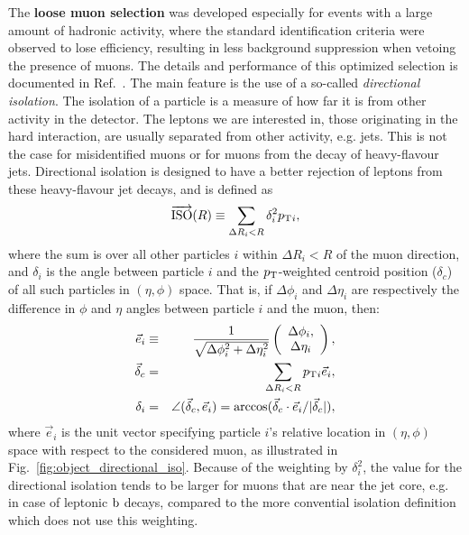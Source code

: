 The \textbf{loose muon selection} was developed especially for events with a
large amount of hadronic activity, where the standard identification criteria were observed to lose
efficiency, resulting in less background suppression when vetoing the presence of muons. 
The details and performance of this optimized selection is documented in
Ref.~\cite{CMS-AN2011-498}. 
The main feature is the use of a so-called \textit{directional isolation}.
The isolation of a particle is a measure of how far it is from other activity in the detector. The
leptons we are interested in, those originating in the hard interaction, are usually separated from
other activity, e.g. jets. This is not the case for misidentified muons or for muons from the decay
of heavy-flavour jets. Directional isolation is designed to have a better rejection of leptons from
these heavy-flavour jet decays, and is defined as
\begin{equation}
\overrightarrow{\mathrm{ISO}}(R) \equiv \sum_{\Delta R_{i} < R} \delta_{i}^{2}p_{\mathrm{T}}{}_{i} ,
\end{equation}
where the sum is over all other particles $i$ within $\Delta R_{i}<R$ of the muon direction,
and $\delta_{i}$ is the angle between particle $i$ and the $p_{\mathrm{T}}$-weighted centroid position
($\delta_{c}$) of all such particles in $(\eta,\phi)$ space. That is, if $\Delta\phi_i$ and
$\Delta\eta_i$ are respectively the difference in $\phi$ and $\eta$ angles between particle $i$ and
the muon, then:
\begin{eqnarray*}
\vec{e}_{i} & \equiv & \frac{1}{\sqrt{\Delta\phi_{i}^{2}+\Delta\eta_{i}^{2}}}\left(\begin{array}{c}
\Delta\phi_{i},\\
\Delta\eta_{i}
\end{array}\right),\\
\vec{\delta}_{c} & = & \sum_{\Delta R_{i}<R}p_{\mathrm{T}}{}_{i}\vec{e}_{i},\\
\delta_{i} & = &
\angle(\vec{\delta}_{c},\vec{e}_{i})=\arccos(\vec{\delta}_{c}\cdot\vec{e}_{i}/|\vec{\delta}_{c}|),
\end{eqnarray*}
where $\vec{e}_{i}$ is the unit vector specifying particle $i$'s relative location in $(\eta,\phi)$
space with respect to the considered muon, as illustrated in Fig.~\ref{fig:object_directional_iso}.
Because of the weighting by $\delta_{i}^{2}$, the value for the directional isolation tends to be
larger for muons that are near the jet core, e.g. in case of leptonic $\mathrm{b}$ decays, compared to
the more convential isolation definition which does not use this weighting. 

